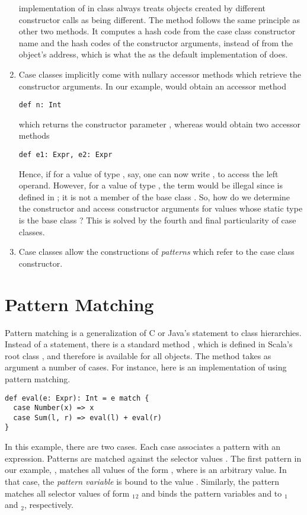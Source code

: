 \begin{enumerate}
implementation of  in class  always treats
objects created by different constructor calls as being different.
The  method follows the same principle as other two
methods. It computes a hash code from the case class constructor name
and the hash codes of the constructor arguments, instead of from the object's
address, which is what the as the default implementation of  does.
\item 
Case classes implicitly come with nullary accessor methods which
retrieve the constructor arguments.
In our example,  would obtain an accessor method
\begin{lstlisting}
def n: Int
\end{lstlisting}
which returns the constructor parameter , whereas  would obtain two accessor methods
\begin{lstlisting}
def e1: Expr, e2: Expr
\end{lstlisting}
Hence, if for a value  of type , say, one can now
write , to access the left operand. However, for a value
 of type , the term  would be illegal
since  is defined in ; it is not a member of the
base class . 
So, how do we determine the constructor and access constructor
arguments for values whose static type is the base class ?
This is solved by the fourth and final particularity of case classes.
\item 
Case classes allow the constructions of {\em patterns} which refer to
the case class constructor.
\end{enumerate}

\section{Pattern Matching}

Pattern matching is a generalization of C or Java's 
statement to class hierarchies. Instead of a  statement,
there is a standard method , which is defined in Scala's
root class , and therefore is available for all objects.
The  method takes as argument a number of cases. 
For instance, here is an implementation of  using 
pattern matching.
\begin{lstlisting}
def eval(e: Expr): Int = e match {
  case Number(x) => x 
  case Sum(l, r) => eval(l) + eval(r) 
}
\end{lstlisting}
In this example, there are two cases. Each case associates a pattern
with an expression. Patterns are matched against the selector
values .  The first pattern in our example,
, matches all values of the form , 
where  is an arbitrary value.  In that case, the {\em pattern
variable}  is bound to the value . Similarly, the
pattern  matches all selector values of form
$_1$$_2$\code{)} and binds the pattern variables
 and  
to $_1$ and $_2$, respectively. 

